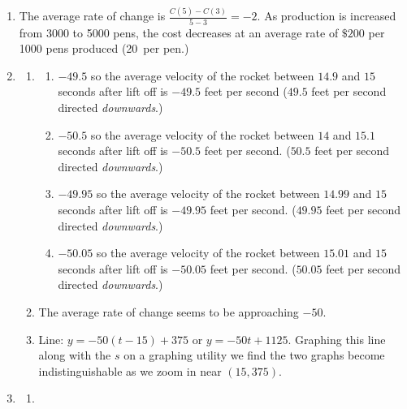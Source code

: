 \documentclass{ximera}
\begin{document}
\begin{enumerate}
\item The average rate of change is $\frac{C(5)-C(3)}{5-3}=-2$.  As production is increased from 3000 to 5000 pens, the cost decreases at an average rate of  $\$200$ per 1000 pens produced (20\textcent \, per pen.)


\item

\begin{enumerate}

\item

\begin{enumerate}

\item  $-49.5$ so the average velocity of the rocket between $14.9$ and $15$ seconds after lift off is $-49.5$ feet per second ($49.5$ feet per second directed \textit{downwards}.)

\item  $-50.5$ so the average velocity of the rocket between $14$ and $15.1$ seconds after lift off is $-50.5$ feet per second. ($50.5$ feet per second directed \textit{downwards}.)

\item  $-49.95$ so the average velocity of the rocket between $14.99$ and $15$ seconds after lift off is $-49.95$ feet per second. ($49.95$ feet per second directed \textit{downwards}.)

\item   $-50.05$ so the average velocity of the rocket between $15.01$ and $15$ seconds after lift off is $-50.05$ feet per second. ($50.05$ feet per second directed \textit{downwards}.)
\end{enumerate}


\item  The average rate of change seems to be approaching $-50$.

\item  Line:  $y = -50(t-15) + 375$ or $y =   -50t + 1125$.  Graphing this line along with the $s$ on a graphing utility we find the two graphs become indistinguishable as we zoom in near $(15, 375)$.

\end{enumerate}

\enlargethispage{0.5in}

\addtocounter{enumi}{3}

\item \begin{enumerate}

 \item


\end{enumerate}
\end{enumerate}
\end{document}
